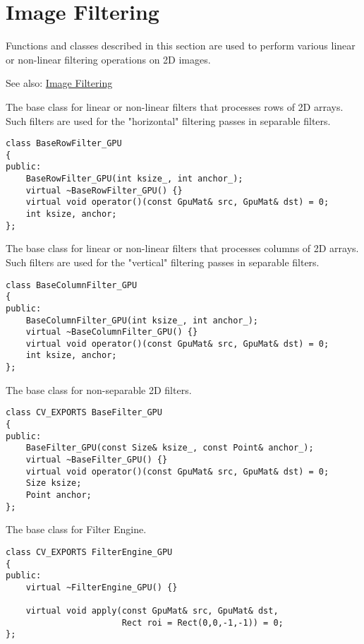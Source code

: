 \section{Image Filtering}

Functions and classes described in this section are used to perform various linear or non-linear filtering operations on 2D images.

See also: \hyperref[section.cpp.cpu.ImageFiltering]{Image Filtering}


\label{class.gpu.BaseRowFilter}
The base class for linear or non-linear filters that processes rows of 2D arrays. Such filters are used for the "horizontal" filtering passes in separable filters.

\begin{lstlisting}
class BaseRowFilter_GPU
{
public:
    BaseRowFilter_GPU(int ksize_, int anchor_);
    virtual ~BaseRowFilter_GPU() {}
    virtual void operator()(const GpuMat& src, GpuMat& dst) = 0;
    int ksize, anchor;
};
\end{lstlisting}


\label{class.gpu.BaseColumnFilter}
The base class for linear or non-linear filters that processes columns of 2D arrays. Such filters are used for the "vertical" filtering passes in separable filters.

\begin{lstlisting}
class BaseColumnFilter_GPU
{
public:
    BaseColumnFilter_GPU(int ksize_, int anchor_);
    virtual ~BaseColumnFilter_GPU() {}
    virtual void operator()(const GpuMat& src, GpuMat& dst) = 0;
    int ksize, anchor;
};
\end{lstlisting}


\label{class.gpu.BaseFilter}
The base class for non-separable 2D filters. 

\begin{lstlisting}
class CV_EXPORTS BaseFilter_GPU
{
public:
    BaseFilter_GPU(const Size& ksize_, const Point& anchor_);
    virtual ~BaseFilter_GPU() {}
    virtual void operator()(const GpuMat& src, GpuMat& dst) = 0;
    Size ksize;
    Point anchor;
};
\end{lstlisting}


\label{class.gpu.FilterEngine}
The base class for Filter Engine.

\begin{lstlisting}
class CV_EXPORTS FilterEngine_GPU
{
public:
    virtual ~FilterEngine_GPU() {}

    virtual void apply(const GpuMat& src, GpuMat& dst, 
                       Rect roi = Rect(0,0,-1,-1)) = 0;
};
\end{lstlisting}

